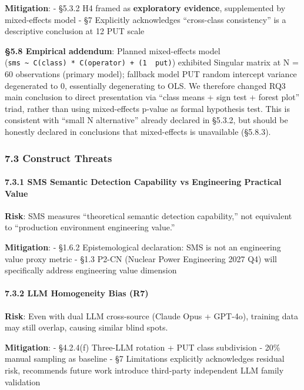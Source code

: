 \documentclass[review,12pt,authoryear]{elsarticle}
\begin{document}
\textbf{Mitigation}: - §5.3.2 H4 framed as \textbf{exploratory
evidence}, supplemented by mixed-effects model - §7 Explicitly
acknowledges ``cross-class consistency'' is a descriptive conclusion at
12 PUT scale

\textbf{§5.8 Empirical addendum}: Planned mixed-effects model
(\texttt{sms\ \textasciitilde{}\ C(class)\ *\ C(operator)\ +\ (1\ \textbar{}\ put)})
exhibited Singular matrix at N = 60 observations (primary model);
fallback model PUT random intercept variance degenerated to 0,
essentially degenerating to OLS. We therefore changed RQ3 main
conclusion to direct presentation via ``class means + sign test + forest
plot'' triad, rather than using mixed-effects p-value as formal
hypothesis test. This is consistent with ``small N alternative'' already
declared in §5.3.2, but should be honestly declared in conclusions that
mixed-effects is unavailable (§5.8.3).

\subsubsection{7.3 Construct Threats}\label{construct-threats}

\paragraph{7.3.1 SMS Semantic Detection Capability vs Engineering
Practical
Value}\label{sms-semantic-detection-capability-vs-engineering-practical-value}

\textbf{Risk}: SMS measures ``theoretical semantic detection
capability,'' not equivalent to ``production environment engineering
value.''

\textbf{Mitigation}: - §1.6.2 Epistemological declaration: SMS is not an
engineering value proxy metric - §1.3 P2-CN (Nuclear Power Engineering
2027 Q4) will specifically address engineering value dimension

\paragraph{7.3.2 LLM Homogeneity Bias
(R7)}\label{llm-homogeneity-bias-r7}

\textbf{Risk}: Even with dual LLM cross-source (Claude Opus + GPT-4o),
training data may still overlap, causing similar blind spots.

\textbf{Mitigation}: - §4.2.4(f) Three-LLM rotation + PUT class
subdivision - 20\% manual sampling as baseline - §7 Limitations
explicitly acknowledges residual risk, recommends future work introduce
third-party independent LLM family validation
\end{document}
